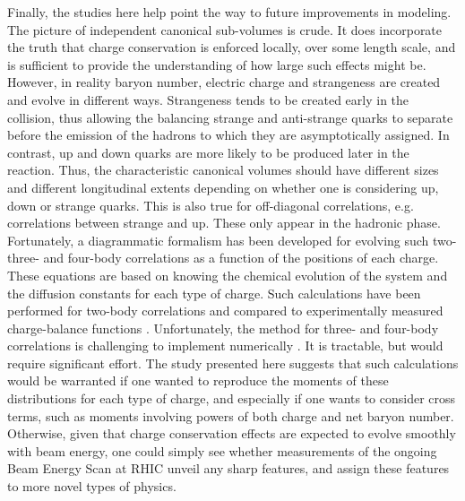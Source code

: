 Finally, the studies here help point the way to future improvements in modeling. The picture of independent canonical sub-volumes is crude. It does incorporate the truth that charge conservation is enforced locally, over some length scale, and is sufficient to provide the understanding of how large such effects might be. However, in reality baryon number, electric charge and strangeness are created and evolve in different ways. Strangeness tends to be created early in the collision, thus allowing the balancing strange and anti-strange quarks to separate before the emission of the hadrons to which they are asymptotically assigned. In contrast, up and down quarks are more likely to be produced later in the reaction. Thus, the characteristic canonical volumes should have different sizes and different longitudinal extents depending on whether one is considering up, down or strange quarks. This is also true for off-diagonal correlations, e.g. correlations between strange and up. These only appear in the hadronic phase. Fortunately, a diagrammatic formalism has been developed for evolving such two- three- and four-body correlations as a function of the positions of each charge. These equations are based on knowing the chemical evolution of the system and the diffusion constants for each type of charge. Such calculations have been performed for two-body correlations and compared to experimentally measured charge-balance functions \cite{Pratt:2018ebf,Pratt:2019pnd}. Unfortunately, the method for three- and four-body correlations  is challenging to implement numerically \cite{Pratt:2019fbj}. It is tractable, but would require significant effort. The study presented here suggests that such calculations would be warranted if one wanted to reproduce the moments of these distributions for each type of charge, and especially if one wants to consider cross terms, such as moments involving powers of both charge and net baryon number. Otherwise, given that charge conservation effects are expected to evolve smoothly with beam energy, one could simply see whether measurements of the ongoing Beam Energy Scan at RHIC unveil any sharp features, and assign these features to more novel types of physics. 